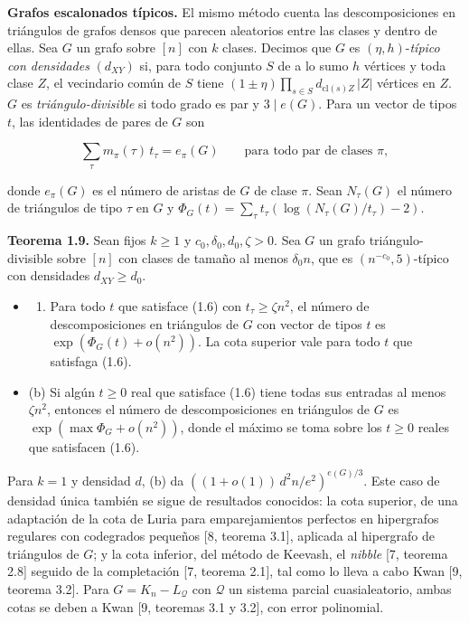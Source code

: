 \documentclass[spanish,11pt,a4paper]{article}
\providecommand{\tightlist}{\setlength{\itemsep}{0pt}\setlength{\parskip}{0pt}}
\begin{document}
\textbf{Grafos escalonados típicos.} El mismo método cuenta las descomposiciones en triángulos de grafos densos que parecen aleatorios entre las clases y dentro de ellas. Sea \(G\) un grafo sobre \([n]\) con \(k\) clases. Decimos que \(G\) es \((\eta,h)\)-\emph{típico con densidades} \((d_{XY})\) si, para todo conjunto \(S\) de a lo sumo \(h\) vértices y toda clase \(Z\), el vecindario común de \(S\) tiene \((1\pm\eta)\prod_{s\in S}d_{\mathrm{cl}(s)Z}\,|Z|\) vértices en \(Z\). \(G\) es \emph{triángulo-divisible} si todo grado es par y \(3\mid e(G)\). Para un vector de tipos \(t\), las identidades de pares de \(G\) son

\nopagebreak[4]
\[\sum_\tau m_\pi(\tau)\,t_\tau=e_\pi(G)\qquad\text{para todo par de clases }\pi,\tag{1.6}\]

donde \(e_\pi(G)\) es el número de aristas de \(G\) de clase \(\pi\). Sean \(N_\tau(G)\) el número de triángulos de tipo \(\tau\) en \(G\) y \(\Phi_G(t)=\sum_\tau t_\tau(\log(N_\tau(G)/t_\tau)-2)\).

\textbf{Teorema 1.9.} Sean fijos \(k\ge1\) y \(c_0,\delta_0,d_0,\zeta>0\). Sea \(G\) un grafo triángulo-divisible sobre \([n]\) con clases de tamaño al menos \(\delta_0 n\), que es \((n^{-c_0},5)\)-típico con densidades \(d_{XY}\ge d_0\).

\begin{itemize}
\tightlist
\item
  \begin{enumerate}
  \def\labelenumi{(\alph{enumi})}
  \tightlist
  \item
    Para todo \(t\) que satisface (1.6) con \(t_\tau\ge\zeta n^2\), el número de descomposiciones en triángulos de \(G\) con vector de tipos \(t\) es \(\exp(\Phi_G(t)+o(n^2))\). La cota superior vale para todo \(t\) que satisfaga (1.6).
  \end{enumerate}
\item
  (b) Si algún \(t\ge0\) real que satisface (1.6) tiene todas sus entradas al menos \(\zeta n^2\), entonces el número de descomposiciones en triángulos de \(G\) es \(\exp(\max\Phi_G+o(n^2))\), donde el máximo se toma sobre los \(t\ge0\) reales que satisfacen (1.6).
\end{itemize}

Para \(k=1\) y densidad \(d\), (b) da \(((1+o(1))\,d^2n/e^2)^{e(G)/3}\). Este caso de densidad única también se sigue de resultados conocidos: la cota superior, de una adaptación de la cota de Luria para emparejamientos perfectos en hipergrafos regulares con codegrados pequeños {[}8, teorema 3.1{]}, aplicada al hipergrafo de triángulos de \(G\); y la cota inferior, del método de Keevash, el \emph{nibble} {[}7, teorema 2.8{]} seguido de la completación {[}7, teorema 2.1{]}, tal como lo lleva a cabo Kwan {[}9, teorema 3.2{]}. Para \(G=K_n-L_{\mathcal Q}\) con \(\mathcal Q\) un sistema parcial cuasialeatorio, ambas cotas se deben a Kwan {[}9, teoremas 3.1 y 3.2{]}, con error polinomial.
\end{document}
